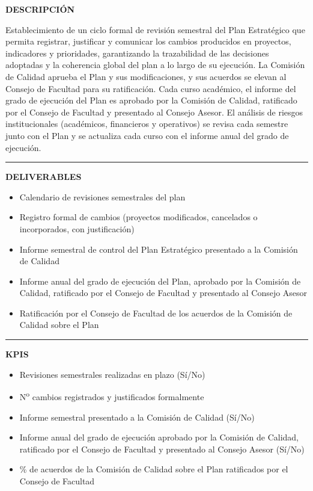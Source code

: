 \documentclass[11pt,a4paper]{scrreprt}
\newcommand{\fieldlabel}[1]{%
  {\footnotesize\sffamily\bfseries\color{mutedcolor}\MakeUppercase{#1}}\par\nopagebreak[4]
}
\newcommand{\fieldsep}{\vspace{3pt}\noindent\textcolor{bordercolor}{\rule{\linewidth}{0.4pt}}\vspace{3pt}\par}
\begin{document}
\begin{tcolorbox}[pabox={gobcolor}{PA5.1 \enspace\textbullet\enspace Revisiones periódicas y gestión del cambio del Plan Estratégico}]

\fieldlabel{Descripci\'on}
{\small Establecimiento de un ciclo formal de revisión semestral del Plan Estratégico que permita registrar, justificar y comunicar los cambios producidos en proyectos, indicadores y prioridades, garantizando la trazabilidad de las decisiones adoptadas y la coherencia global del plan a lo largo de su ejecución. La Comisión de Calidad aprueba el Plan y sus modificaciones, y sus acuerdos se elevan al Consejo de Facultad para su ratificación. Cada curso académico, el informe del grado de ejecución del Plan es aprobado por la Comisión de Calidad, ratificado por el Consejo de Facultad y presentado al Consejo Asesor. El análisis de riesgos institucionales (académicos, financieros y operativos) se revisa cada semestre junto con el Plan y se actualiza cada curso con el informe anual del grado de ejecución.}\par
\fieldsep
\fieldlabel{Deliverables}
{\small \begin{itemize}[noitemsep,topsep=2pt]
\item Calendario de revisiones semestrales del plan
\item Registro formal de cambios (proyectos modificados, cancelados o incorporados, con justificación)
\item Informe semestral de control del Plan Estratégico presentado a la Comisión de Calidad
\item Informe anual del grado de ejecución del Plan, aprobado por la Comisión de Calidad, ratificado por el Consejo de Facultad y presentado al Consejo Asesor
\item Ratificación por el Consejo de Facultad de los acuerdos de la Comisión de Calidad sobre el Plan
\end{itemize}}\par
\fieldsep
\fieldlabel{KPIs}
{\small \begin{itemize}[noitemsep,topsep=2pt]
\item Revisiones semestrales realizadas en plazo (Sí/No)
\item N\textsuperscript{o} cambios registrados y justificados formalmente
\item Informe semestral presentado a la Comisión de Calidad (Sí/No)
\item Informe anual del grado de ejecución aprobado por la Comisión de Calidad, ratificado por el Consejo de Facultad y presentado al Consejo Asesor (Sí/No)
\item \% de acuerdos de la Comisión de Calidad sobre el Plan ratificados por el Consejo de Facultad
\end{itemize}}\par
\end{tcolorbox}
\end{document}
